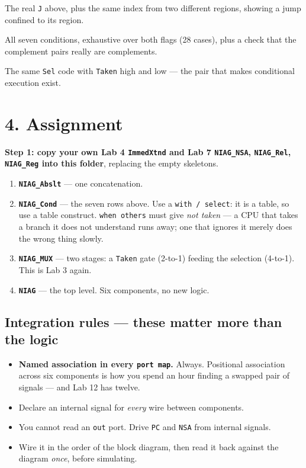 \documentclass[11pt]{article}
\newcommand{\code}[1]{\texttt{#1}}
\begin{document}
\begin{description}[leftmargin=2.4em,style=nextline,itemsep=2pt]
\item[Example 1 --- \code{absolute\_target}] The real \code{J} above, plus the
same index from two different regions, showing a jump confined to its region.
\item[Example 2 --- \code{branch\_conditions}] All seven conditions, exhaustive
over both flags (28 cases), plus a check that the complement pairs really are
complements.
\item[Example 3 --- \code{pc\_select}] The same \code{Sel} code with
\code{Taken} high and low --- the pair that makes conditional execution exist.
\end{description}

\section*{4. Assignment}

\textbf{Step 1: copy your own Lab 4 \code{ImmedXtnd} and Lab 7
\code{NIAG\_NSA}, \code{NIAG\_Rel}, \code{NIAG\_Reg} into this folder}, replacing
the empty skeletons.

\begin{enumerate}[leftmargin=2em,itemsep=3pt]
\item \textbf{\code{NIAG\_Abslt}} --- one concatenation.
\item \textbf{\code{NIAG\_Cond}} --- the seven rows above. Use a
\code{with\,/\,select}: it is a table, so use a table construct. \code{when
others} must give \emph{not taken} --- a CPU that takes a branch it does not
understand runs away; one that ignores it merely does the wrong thing slowly.
\item \textbf{\code{NIAG\_MUX}} --- two stages: a \code{Taken} gate (2-to-1)
feeding the selection (4-to-1). This is Lab 3 again.
\item \textbf{\code{NIAG}} --- the top level. Six components, no new logic.
\end{enumerate}

\subsection*{Integration rules --- these matter more than the logic}

\begin{itemize}[leftmargin=1.6em,itemsep=1pt]
\item \textbf{Named association in every \code{port map}.} Always. Positional
association across six components is how you spend an hour finding a swapped
pair of signals --- and Lab 12 has twelve.
\item Declare an internal signal for \emph{every} wire between components.
\item You cannot read an \code{out} port. Drive \code{PC} and \code{NSA} from
internal signals.
\item Wire it in the order of the block diagram, then read it back against the
diagram \emph{once}, before simulating.
\end{itemize}
\end{document}
